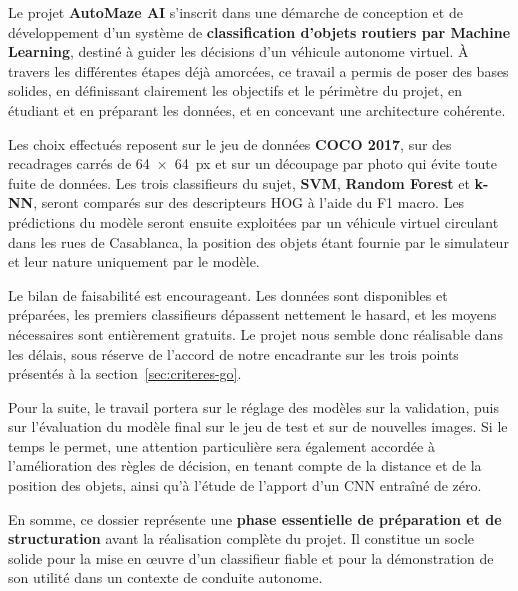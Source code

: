 
Le projet \textbf{AutoMaze AI} s'inscrit dans une démarche de conception et de développement d'un système de \textbf{classification d'objets routiers par Machine Learning}, destiné à guider les décisions d'un véhicule autonome virtuel. À travers les différentes étapes déjà amorcées, ce travail a permis de poser des bases solides, en définissant clairement les objectifs et le périmètre du projet, en étudiant et en préparant les données, et en concevant une architecture cohérente.

Les choix effectués reposent sur le jeu de données \textbf{COCO 2017}, sur des recadrages carrés de 64~×~64~px et sur un découpage par photo qui évite toute fuite de données. Les trois classifieurs du sujet, \textbf{SVM}, \textbf{Random Forest} et \textbf{k-NN}, seront comparés sur des descripteurs HOG à l'aide du F1 macro. Les prédictions du modèle seront ensuite exploitées par un véhicule virtuel circulant dans les rues de Casablanca, la position des objets étant fournie par le simulateur et leur nature uniquement par le modèle.

Le bilan de faisabilité est encourageant. Les données sont disponibles et préparées, les premiers classifieurs dépassent nettement le hasard, et les moyens nécessaires sont entièrement gratuits. Le projet nous semble donc réalisable dans les délais, sous réserve de l'accord de notre encadrante sur les trois points présentés à la section~\ref{sec:criteres-go}.

Pour la suite, le travail portera sur le réglage des modèles sur la validation, puis sur l'évaluation du modèle final sur le jeu de test et sur de nouvelles images. Si le temps le permet, une attention particulière sera également accordée à l'amélioration des règles de décision, en tenant compte de la distance et de la position des objets, ainsi qu'à l'étude de l'apport d'un CNN entraîné de zéro.

En somme, ce dossier représente une \textbf{phase essentielle de préparation et de structuration} avant la réalisation complète du projet. Il constitue un socle solide pour la mise en œuvre d'un classifieur fiable et pour la démonstration de son utilité dans un contexte de conduite autonome.
